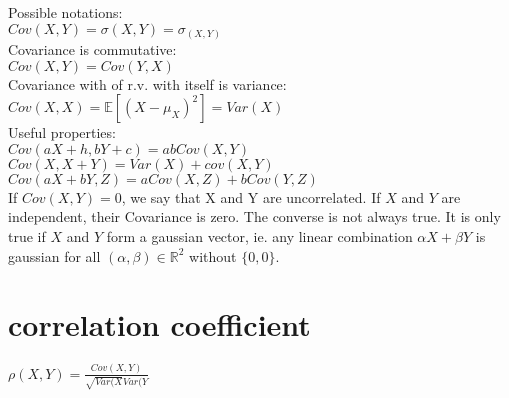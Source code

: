 Possible notations:\\

$Cov(X,Y) = \sigma(X,Y) = \sigma_ {(X,Y)}$\\

Covariance is commutative:\\

$Cov(X,Y) = Cov(Y,X)$\\

Covariance with of r.v. with itself is variance:\\

$Cov(X,X) = \mathbb E[(X - \mu _ X)^2] = Var(X)$\\

Useful properties:\\

$Cov(aX + h,bY + c)= abCov(X,Y)$\\

$Cov(X,X + Y)= Var(X) + cov(X,Y)$\\

$\displaystyle  Cov(aX+ bY, Z) \displaystyle = aCov(X,Z) + bCov(Y,Z)$\\

If $Cov(X,Y) = 0$, we say that X and Y are uncorrelated. If $X$ and $Y$ are independent, their Covariance is zero. The converse is not always true. It is only true if $X$ and $Y$ form a gaussian vector, ie. any linear combination $\alpha X + \beta Y$ is gaussian for all $(\alpha,\beta) \in \mathbb{R}^2$ without $\{0,0\}$.

\section{correlation coefficient}

$\rho(X,Y) = \frac{Cov(X,Y)}{\sqrt{Var(X}Var(Y}$